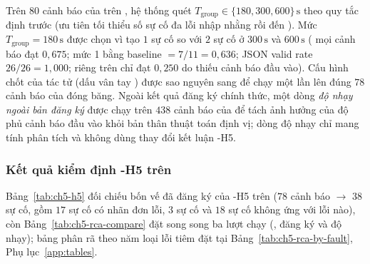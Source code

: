 Trên $80$ cảnh báo của \CTAV{} trên , hệ thống quét $T_{\text{group}} \in \{180, 300, 600\}\,\text{s}$ theo quy tắc định trước (ưu tiên tối thiểu số sự cố đa lỗi nhập nhằng  rồi đến ). Mức $T_{\text{group}} = 180\,\text{s}$ được chọn vì tạo $1$ sự cố  so với $2$ sự cố ở $300\,\text{s}$ và $600\,\text{s}$ ( mọi cảnh báo đạt $0{,}675$;  mức 1 bằng baseline $= 7/11 = 0{,}636$; JSON valid rate $26/26 = 1{,}000$; riêng  trên  chỉ đạt $0{,}250$ do thiếu cảnh báo đầu vào). Cấu hình chốt của tác tử  (dấu vân tay ) được sao nguyên sang  để chạy một lần lên đúng $78$ cảnh báo của \CTAV{} đóng băng. Ngoài kết quả đăng ký chính thức, một dòng \emph{độ nhạy ngoài bản đăng ký} được chạy trên $438$ cảnh báo của  để tách ảnh hưởng của độ phủ cảnh báo đầu vào khỏi bản thân thuật toán định vị; dòng độ nhạy chỉ mang tính phân tích và không dùng thay đổi kết luận \hyp{H5}.

\subsubsection{Kết quả kiểm định \hyp{H5} trên }
\label{sec:ch5-rca-results}

Bảng~\ref{tab:ch5-h5} đối chiếu bốn vế đã đăng ký của \hyp{H5} trên  ($78$ cảnh báo $\to$ $38$ sự cố, gồm $17$ sự cố có nhãn đơn lỗi, $3$ sự cố  và $18$ sự cố không ứng với lỗi nào), còn Bảng~\ref{tab:ch5-rca-compare} đặt song song ba lượt chạy (,  đăng ký và  độ nhạy); bảng phân rã theo năm loại lỗi tiêm đặt tại Bảng~\ref{tab:ch5-rca-by-fault}, Phụ lục~\ref{app:tables}.

